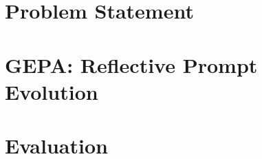 \documentclass{article} %
\begin{document}

\section{Problem Statement}\label{sec:preliminaries}



\section{GEPA: Reflective Prompt Evolution}\label{gepa_algorithm}


\section{Evaluation}



\end{document}
